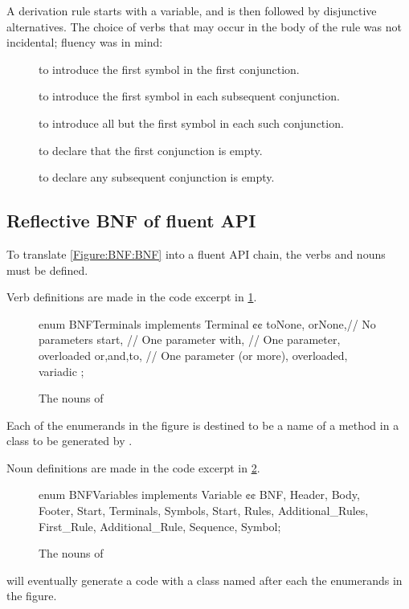 A derivation rule starts with a variable, and is then followed by disjunctive alternatives.
The choice of verbs that may occur in the body of the rule was not incidental; 
  fluency was in mind:
\begin{description}
  \item[] to introduce the first symbol in the first conjunction.
  \item[] to introduce the first symbol in each subsequent conjunction.
  \item[] to introduce all but the first symbol in each such conjunction.
  \item[] to declare that the first conjunction is empty.
  \item[] to declare any subsequent conjunction is empty.
\end{description}

\subsection{Reflective BNF of fluent API}

To translate \cref{Figure:BNF:BNF} into a fluent
API chain, the verbs and nouns must be defined.

Verb definitions are made in the code excerpt in
\cref{Figure:Verbs}.

\begin{figure}[H]
  \begin{JAVA}[style=code]
enum BNFTerminals implements Terminal {¢¢
  toNone, orNone,// No parameters
  start,         // One parameter 
  with,          // One parameter, overloaded 
  or,and,to,     // One parameter (or more), overloaded, variadic 
  ;
} \end{JAVA}
  \caption{The nouns of \Self}
  \label{Figure:Verbs}
\end{figure}
Each of the enumerands in the figure is destined to be a 
  name of a method in a class to be generated by \Self.

Noun definitions are made in the code excerpt in \cref{Figure:Nouns}.

\begin{figure}[H]
  \begin{JAVA}[style=code]
enum BNFVariables implements Variable {¢¢
  BNF, Header, Body, Footer,
  Start, Terminals, Symbols,
  Start, Rules, Additional_Rules,
  First_Rule, Additional_Rule,
  Sequence, Symbol;
}\end{JAVA}
  \caption{The nouns of \Self}
  \label{Figure:Nouns}
\end{figure}
  \Self will eventually generate a code with
  a class named after each the enumerands in the figure.

